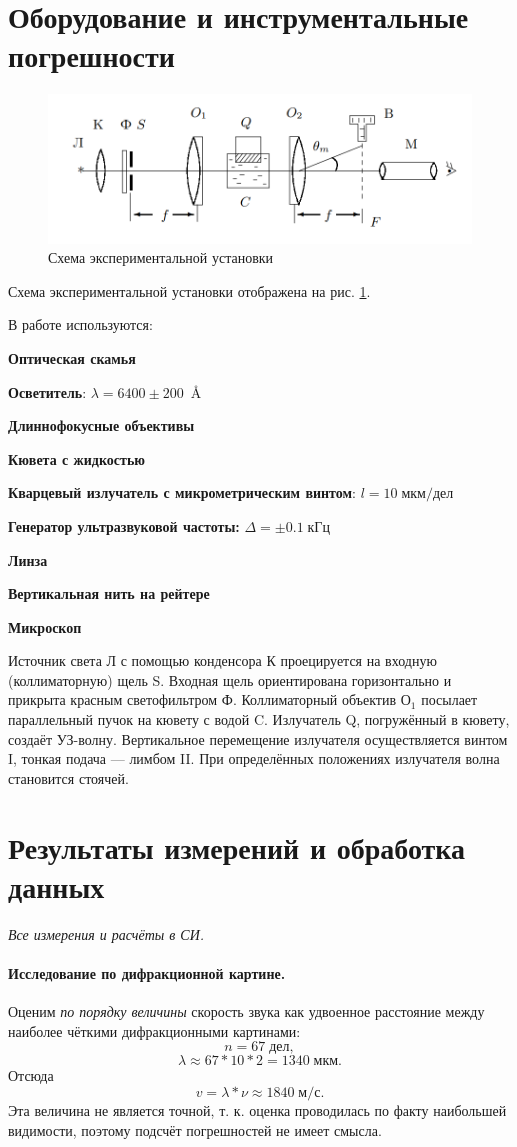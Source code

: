 \documentclass[a4paper]{article}
\newcommand{\Equip}[3]{
	
	{\bf #1:} $\Delta = \pm #2\; #3$}
\newcommand{\equip}[1]{
	
	{\bf #1}}
\begin{document}
\section{Оборудование и инструментальные погрешности}

\begin{figure}[tbp]
	\centering
	\includegraphics[width=0.8\linewidth]{Screenshot_1}
	\caption{Схема экспериментальной установки}
	\label{fig:screenshot1}
\end{figure}


Схема экспериментальной установки отображена на рис. \ref{fig:screenshot1}.

В работе используются:
\equip{Оптическая скамья}
\equip{Осветитель}: $ \lambda = 6400 \pm 200 \;\SI{}{\angstrom} $
\equip{Длиннофокусные объективы}
\equip{Кювета с жидкостью}
\equip{Кварцевый излучатель с микрометрическим винтом}: $ l = 10 \;мкм/дел $
\Equip{Генератор ультразвуковой частоты}{0.1}{кГц}
\equip{Линза}
\equip{Вертикальная нить на рейтере}
\equip{Микроскоп}

Источник света Л с помощью конденсора К проецируется на входную (коллиматорную) щель S. Входная щель ориентирована горизонтально и прикрыта красным светофильтром Ф. Коллиматорный объектив $ О_1 $ посылает параллельный пучок на кювету с водой C. Излучатель Q, погружённый в кювету, создаёт УЗ-волну. Вертикальное перемещение излучателя осуществляется винтом I, тонкая подача — лимбом II. При определённых положениях излучателя волна становится стоячей.

\section{Результаты измерений и обработка данных}
\emph{Все измерения и расчёты в СИ.}

\paragraph{Исследование по дифракционной картине. }

Оценим \emph{по порядку величины} скорость звука как удвоенное расстояние между наиболее чёткими дифракционными картинами:
\[n = 67 \;дел,\]
\[\lambda \approx 67*10*2=1340 \; мкм. \]
Отсюда 
\[v = \lambda * \nu \approx 1840 \; м/с.\]
Эта величина не является точной, т. к. оценка проводилась по факту наибольшей видимости, поэтому подсчёт погрешностей не имеет смысла.
\end{document}
